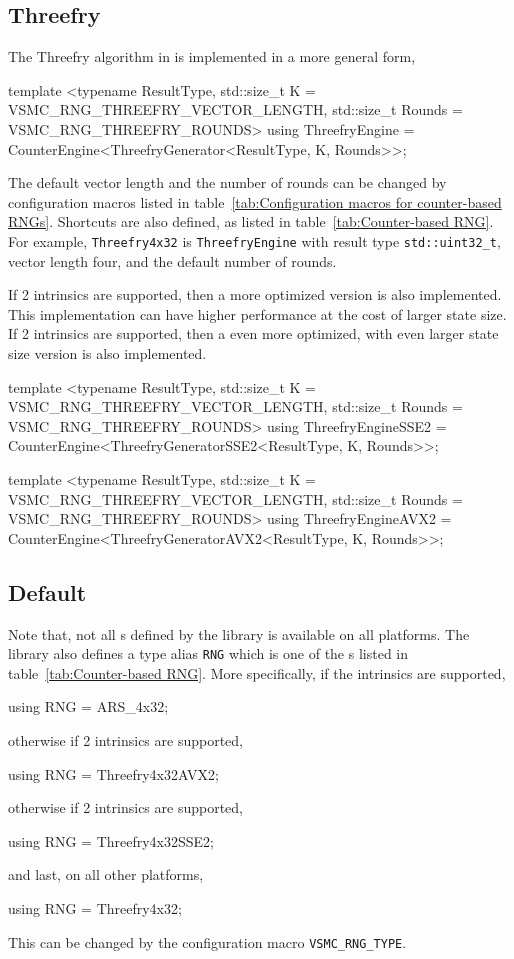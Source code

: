 \subsection{Threefry}
\label{sub:Threefry}

The Threefry algorithm in \textcite{Salmon:2011um} is implemented in a more
general form,
\begin{cppcode}
  template <typename ResultType, std::size_t K = VSMC_RNG_THREEFRY_VECTOR_LENGTH,
      std::size_t Rounds = VSMC_RNG_THREEFRY_ROUNDS>
  using ThreefryEngine = CounterEngine<ThreefryGenerator<ResultType, K, Rounds>>;
\end{cppcode}
The default vector length and the number of rounds can be changed by
configuration macros listed in table~\ref{tab:Configuration macros for
  counter-based RNGs}. Shortcuts are also defined, as listed in
table~\ref{tab:Counter-based RNG}. For example, \verb|Threefry4x32| is
\verb|ThreefryEngine| with result type \verb|std::uint32_t|, vector length
four, and the default number of rounds.

If \sse{}2 intrinsics are supported, then a more optimized version is also
implemented. This implementation can have higher performance at the cost of
larger state size. If \avx{}2 intrinsics are supported, then a even more
optimized, with even larger state size version is also implemented.
\begin{cppcode}
  template <typename ResultType, std::size_t K = VSMC_RNG_THREEFRY_VECTOR_LENGTH,
      std::size_t Rounds = VSMC_RNG_THREEFRY_ROUNDS>
  using ThreefryEngineSSE2 =
      CounterEngine<ThreefryGeneratorSSE2<ResultType, K, Rounds>>;

  template <typename ResultType, std::size_t K = VSMC_RNG_THREEFRY_VECTOR_LENGTH,
      std::size_t Rounds = VSMC_RNG_THREEFRY_ROUNDS>
  using ThreefryEngineAVX2 =
      CounterEngine<ThreefryGeneratorAVX2<ResultType, K, Rounds>>;
\end{cppcode}

\subsection{Default \protect\rng}
\label{sub:Default RNG}

Note that, not all \rng{}s defined by the library is available on all
platforms. The library also defines a type alias \verb|RNG| which is one of the
\rng{}s listed in table~\ref{tab:Counter-based RNG}. More specifically, if the
\aesni intrinsics are supported,
\begin{cppcode}
  using RNG = ARS_4x32;
\end{cppcode}
otherwise if \avx{}2 intrinsics are supported,
\begin{cppcode}
  using RNG = Threefry4x32AVX2;
\end{cppcode}
otherwise if \sse{}2 intrinsics are supported,
\begin{cppcode}
  using RNG = Threefry4x32SSE2;
\end{cppcode}
and last, on all other platforms,
\begin{cppcode}
  using RNG = Threefry4x32;
\end{cppcode}
This can be changed by the configuration macro \verb|VSMC_RNG_TYPE|.

